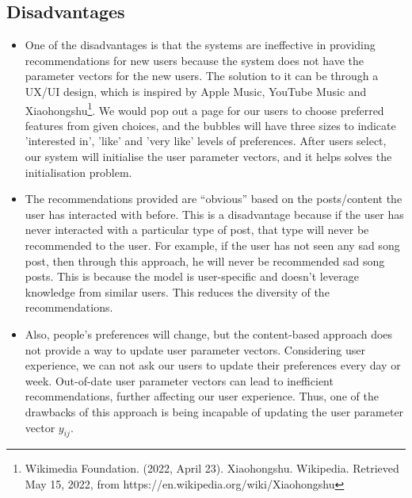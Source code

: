 \subsection*{Disadvantages}
\begin{itemize}
\item One of the disadvantages is that the systems are ineffective in providing recommendations for new users because the system does not have the parameter vectors for the new users. 
The solution to it can be through a UX/UI design, which is inspired by Apple Music, YouTube Music and Xiaohongshu\footnote{Wikimedia Foundation. (2022, April 23). Xiaohongshu. Wikipedia. Retrieved May 15, 2022, from https://en.wikipedia.org/wiki/Xiaohongshu }. We would pop out a page for our users to choose preferred features from given choices, and the bubbles will have three sizes to indicate 'interested in', 'like' and 'very like' levels of preferences. After users select, our system will initialise the user parameter vectors, and it helps solves the initialisation problem.%
\item The recommendations provided are “obvious” based on the posts/content the user has interacted with before. This is a disadvantage because if the user has never interacted with a particular type of post, that type will never be recommended to the user. 
For example, if the user has not seen any sad song post, then through this approach, he will never be recommended sad song posts. This is because the model is user-specific and doesn’t leverage knowledge from similar users. This reduces the diversity of the recommendations.
%
\item Also, people's preferences will change, but the content-based approach does not provide a way to update user parameter vectors. Considering user experience, we can not ask our users to update their preferences every day or week. Out-of-date user parameter vectors can lead to inefficient recommendations, further affecting our user experience. Thus, one of the drawbacks of this approach is being incapable of updating the user parameter vector $y_{ij}$.
\end{itemize}



